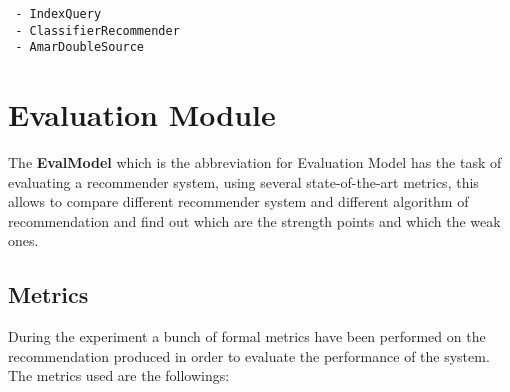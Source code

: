 \documentclass[11pt]{article}
\begin{document}
    \lstinline[style=verbatim-text]| - IndexQuery |  \\


    \lstinline[style=verbatim-text]| - ClassifierRecommender |  \\


    \lstinline[style=verbatim-text]| - AmarDoubleSource |  \\



\section{Evaluation Module}\label{sec:eva-module}
The \textbf{EvalModel} which is the abbreviation for Evaluation Model has the task of evaluating a recommender system,
using several state-of-the-art metrics, this allows to compare different recommender system and different algorithm of
recommendation and find out which are the strength points and which the weak ones.

\subsection{Metrics}\label{subsec:metrics}
During the experiment a bunch of formal metrics have been performed on the recommendation produced in order to evaluate
the performance of the system.
The metrics used are the followings:
\hfill\break
\end{document}
